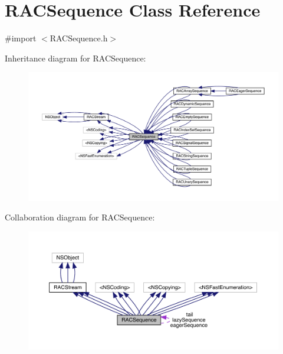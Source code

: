 \hypertarget{interface_r_a_c_sequence}{}\section{R\+A\+C\+Sequence Class Reference}
\label{interface_r_a_c_sequence}


{\ttfamily \#import $<$R\+A\+C\+Sequence.\+h$>$}



Inheritance diagram for R\+A\+C\+Sequence\+:\nopagebreak
\begin{figure}[H]
\begin{center}
\leavevmode
\includegraphics[width=350pt]{interface_r_a_c_sequence__inherit__graph}
\end{center}
\end{figure}


Collaboration diagram for R\+A\+C\+Sequence\+:\nopagebreak
\begin{figure}[H]
\begin{center}
\leavevmode
\includegraphics[width=350pt]{interface_r_a_c_sequence__coll__graph}
\end{center}
\end{figure}
